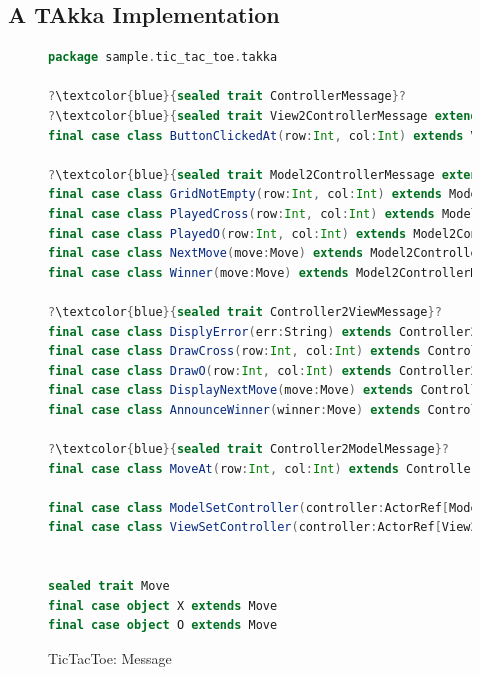 \subsection{A TAkka Implementation}




\begin{figure}[p]
\begin{lstlisting}[language=scala, escapechar=?]
package sample.tic_tac_toe.takka

?\textcolor{blue}{sealed trait ControllerMessage}?
?\textcolor{blue}{sealed trait View2ControllerMessage extends ControllerMessage}?
final case class ButtonClickedAt(row:Int, col:Int) extends View2ControllerMessage

?\textcolor{blue}{sealed trait Model2ControllerMessage extends ControllerMessage}?
final case class GridNotEmpty(row:Int, col:Int) extends Model2ControllerMessage
final case class PlayedCross(row:Int, col:Int) extends Model2ControllerMessage
final case class PlayedO(row:Int, col:Int) extends Model2ControllerMessage
final case class NextMove(move:Move) extends Model2ControllerMessage
final case class Winner(move:Move) extends Model2ControllerMessage

?\textcolor{blue}{sealed trait Controller2ViewMessage}?
final case class DisplyError(err:String) extends Controller2ViewMessage
final case class DrawCross(row:Int, col:Int) extends Controller2ViewMessage
final case class DrawO(row:Int, col:Int) extends Controller2ViewMessage
final case class DisplayNextMove(move:Move) extends Controller2ViewMessage
final case class AnnounceWinner(winner:Move) extends Controller2ViewMessage

?\textcolor{blue}{sealed trait Controller2ModelMessage}?
final case class MoveAt(row:Int, col:Int) extends Controller2ModelMessage

final case class ModelSetController(controller:ActorRef[Model2ControllerMessage]) extends Controller2ModelMessage
final case class ViewSetController(controller:ActorRef[View2ControllerMessage]) extends Controller2ViewMessage


sealed trait Move
final case object X extends Move
final case object O extends Move
\end{lstlisting}
\caption{TicTacToe: Message}
\label{TTT_message}
\end{figure}

